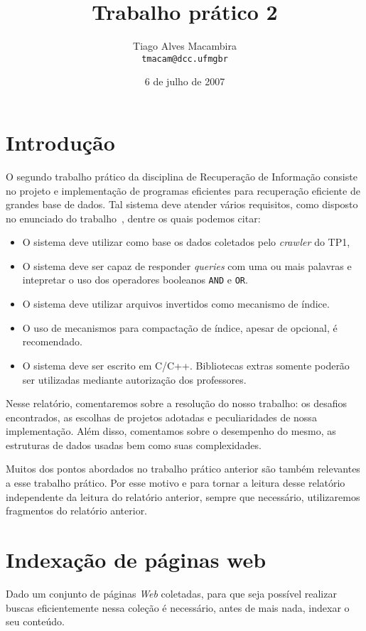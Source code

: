 \documentclass[10pt,twocolumn]{article}
\title{Trabalho prático 2}
\author{Tiago Alves Macambira \\ \texttt{tmacam@dcc.ufmgbr}}
\date{6 de julho de 2007}
\begin{document}
\maketitle

\section{Introdução}

O segundo trabalho prático da disciplina de Recuperação de Informação
consiste no projeto e implementação de programas eficientes para
recuperação eficiente de grandes base de dados. Tal sistema deve
 atender vários requisitos, como disposto no
enunciado do trabalho~\cite{tp1}, dentre os quais podemos citar:
\begin{itemize}
\item O sistema deve utilizar como base os dados coletados pelo
\emph{crawler} do TP1,
\item O sistema deve ser capaz de responder \emph{queries} com uma ou
mais palavras e intepretar o uso dos operadores booleanos \texttt{AND}
e \texttt{OR}.
\item O sistema deve utilizar arquivos invertidos como mecanismo
de índice.
\item O uso de mecanismos para compactação de índice, apesar de
opcional, é recomendado.
\item O sistema deve ser escrito em C/C++. Bibliotecas extras somente
poderão ser utilizadas mediante autorização dos professores.
\end{itemize}

Nesse relatório, comentaremos sobre a resolução do nosso trabalho:
os desafios encontrados, as escolhas de projetos
adotadas e peculiaridades de nossa implementação. Além disso, comentamos
sobre o desempenho do mesmo, as estruturas de dados usadas bem como suas
complexidades.

Muitos dos pontos abordados no trabalho prático anterior são também
relevantes a esse trabalho prático. Por esse motivo e para tornar a
leitura desse relatório independente da leitura do relatório anterior,
sempre que necessário, utilizaremos fragmentos do relatório anterior.

\section{Indexação de páginas web}

Dado um conjunto de páginas \emph{Web} coletadas, para que seja possível
realizar buscas eficientemente nessa coleção é necessário, antes de mais
nada, indexar o seu conteúdo.
\end{document}
